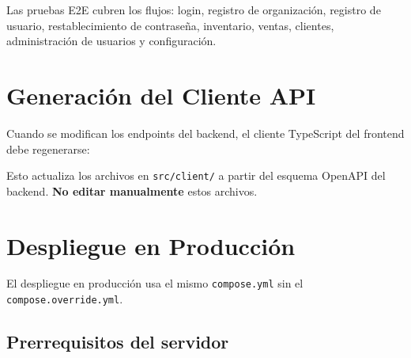 \begin{Shaded}
\begin{Highlighting}[]



 

\end{Highlighting}
\end{Shaded}

Las pruebas E2E cubren los flujos: login, registro de organización, registro de usuario, restablecimiento de contraseña, inventario, ventas, clientes, administración de usuarios y configuración.

\section{Generación del Cliente API}\label{generaciuxf3n-del-cliente-api}

Cuando se modifican los endpoints del backend, el cliente TypeScript del frontend debe regenerarse:

\begin{Shaded}
\begin{Highlighting}[]
\end{Highlighting}
\end{Shaded}

Esto actualiza los archivos en \texttt{src/client/} a partir del esquema OpenAPI del backend. \textbf{No editar manualmente} estos archivos.

\section{Despliegue en Producción}\label{despliegue-en-producciuxf3n}

El despliegue en producción usa el mismo \texttt{compose.yml} sin el \texttt{compose.override.yml}.

\subsection{Prerrequisitos del servidor}\label{prerrequisitos-del-servidor}

